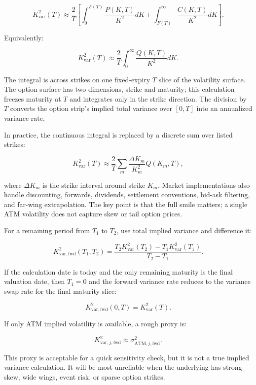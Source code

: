 \documentclass[11pt]{article}
\begin{document}
\begin{equation}
    K_{\mathrm{var}}^2(T)
    \approx
    \frac{2}{T}
    \left[
        \int_{0}^{F(T)}
        \frac{P(K,T)}{K^2}
        dK
        +
        \int_{F(T)}^{\infty}
        \frac{C(K,T)}{K^2}
        dK
    \right].
\end{equation}

Equivalently:

\begin{equation}
    K_{\mathrm{var}}^2(T)
    \approx
    \frac{2}{T}
    \int_{0}^{\infty}
    \frac{Q(K,T)}{K^2}
    dK .
\end{equation}

The integral is across strikes on one fixed-expiry $T$ slice of the volatility surface. The option surface has two dimensions, strike and maturity; this calculation freezes maturity at $T$ and integrates only in the strike direction. The division by $T$ converts the option strip's implied total variance over $[0,T]$ into an annualized variance rate.

In practice, the continuous integral is replaced by a discrete sum over listed strikes:

\begin{equation}
    K_{\mathrm{var}}^2(T)
    \approx
    \frac{2}{T}
    \sum_m
    \frac{\Delta K_m}{K_m^2}
    Q(K_m,T),
\end{equation}

where $\Delta K_m$ is the strike interval around strike $K_m$. Market implementations also handle discounting, forwards, dividends, settlement conventions, bid-ask filtering, and far-wing extrapolation. The key point is that the full smile matters; a single ATM volatility does not capture skew or tail option prices.

For a remaining period from $T_1$ to $T_2$, use total implied variance and difference it:

\begin{equation}
    K_{\mathrm{var},\mathrm{fwd}}^2(T_1,T_2)
    =
    \frac{
        T_2 K_{\mathrm{var}}^2(T_2)
        -
        T_1 K_{\mathrm{var}}^2(T_1)
    }{
        T_2 - T_1
    }.
\end{equation}

If the calculation date is today and the only remaining maturity is the final valuation date, then $T_1=0$ and the forward variance rate reduces to the variance swap rate for the final maturity slice:

\begin{equation}
    K_{\mathrm{var},\mathrm{fwd}}^2(0,T)
    =
    K_{\mathrm{var}}^2(T).
\end{equation}

If only ATM implied volatility is available, a rough proxy is:

\begin{equation}
    K_{\mathrm{var},j,\mathrm{fwd}}^2
    \approx
    \sigma_{\mathrm{ATM},j,\mathrm{fwd}}^2 .
\end{equation}

This proxy is acceptable for a quick sensitivity check, but it is not a true implied variance calculation. It will be most unreliable when the underlying has strong skew, wide wings, event risk, or sparse option strikes.
\end{document}
